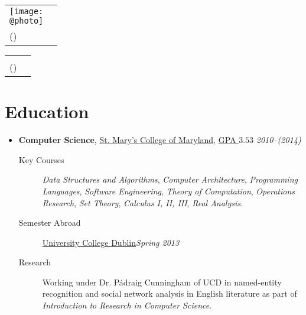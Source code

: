 \documentclass[11pt,letterpaper]{article}
\author{Sean Allred}
\makeatletter
\newcommand{\position}[5]{\item%
  \begin{tabular*}{1.0\linewidth}{l@{\extracolsep{\fill}}r}
    #1 & #2\\
    \textit{#3} & \textit{#4---#5}
  \end{tabular*}}
\renewcommand{\position}[6][]{%
\item[#1] \hspace*{-2em}\textbf{#4}, #2, #3\hfill
  \textit{#5--#6}\vspace*{-.8em}}
\renewcommand{\maketitle}{%
  \noindent
  \ifdefined\@photo
  \usepackage{multirow}
  \begin{tabular*}{1.0\linewidth}{l@{\extracolsep{\fill}}r}
    \multirow{2}{*}{\texttt{[image: \\@photo]}}\\
     {\@namestyle\@author}           & \@addressA\\
    {\@emailstyle\@email} (\@phone)  & \@addressB
  \end{tabular*}
  \else
  \begin{tabular*}{1.0\linewidth}{l@{\extracolsep{\fill}}r}
     {\@namestyle\@author}           & \@addressA\\
    {\@emailstyle\@email} (\@phone)  & \@addressB
  \end{tabular*}
  \fi
}
\newcommand{\course}[1]{\textit{#1}}
\newcommand{\smcm}{\href{http://www.smcm.edu}
                        {St. Mary's College of Maryland}}
\makeatother
\begin{document}
\maketitle

\section*{Education}
\begin{itemize}
\position[] {\smcm}
          {\href{http://dl.dropbox.com/u/17471132/transcript20130330.pdf}
                {GPA $3.53$}}
          {Computer Science}
          {2010}{(2014)}
          \begin{description}
          \item[Key Courses] \course{Data Structures and Algorithms},
            \course{Computer Architecture}, \course{Programming
              Languages}, \course{Software Engineering},
            \course{Theory of Computation}, \course{Operations
              Research}, \course{Set Theory}, \course{Calculus I, II,
              III}, \course{Real Analysis}.
          \item[Semester Abroad] \href{http://www.ucd.ie}{University
              College Dublin}\hfill \textit{Spring 2013}
          \item[Research] Working under Dr. P\'adraig Cunningham of
            UCD in named-entity recognition and social network
            analysis in English literature as part of
            \textit{Introduction to Research in Computer Science}.
          \end{description}
\end{itemize}
\end{document}
